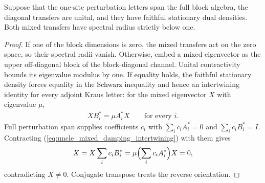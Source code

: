 \begin{lemma}
    \label{lem:uncle_mixed_damping_from_span}
    \leanok
    Suppose that the one-site perturbation letters span the full block
    algebra, the diagonal transfers are unital, and they have faithful
    stationary dual densities. Both mixed transfers have spectral radius
    strictly below one.
\end{lemma}
\begin{proof}
    \leanok
    If one of the block dimensions is zero, the mixed transfers act on
    the zero space, so their spectral radii vanish. Otherwise, embed a
    mixed eigenvector as the upper off-diagonal block of the
    block-diagonal channel. Unital contractivity bounds its eigenvalue
    modulus by one. If equality holds, the faithful stationary density
    forces equality in the Schwarz inequality and hence an intertwining
    identity for every adjoint Kraus letter: for the mixed eigenvector $X$
    with eigenvalue $\mu$,
    \begin{align}
        XB_i^*=\mu A_i^*X\qquad\text{for every }i.
        \label{eq:uncle_mixed_damping_intertwining}
    \end{align}
    Full perturbation span supplies coefficients $c_i$ with
    $\sum_ic_iA_i^*=0$ and $\sum_ic_iB_i^*=I$. Contracting
    (\ref{eq:uncle_mixed_damping_intertwining}) with them gives
    \begin{align}
        X=X\sum_ic_iB_i^*=\mu\Bigl(\sum_ic_iA_i^*\Bigr)X=0,
    \end{align}
    contradicting $X\ne0$. Conjugate transpose treats the reverse
    orientation.
\end{proof}

